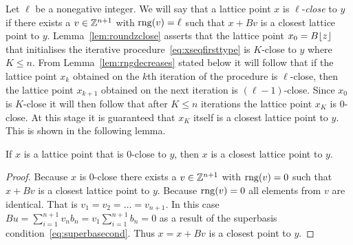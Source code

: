\documentclass[final,leqno]{siamltex}
\begin{document}
Let $\ell$ be a nonegative integer.  We will say that a lattice point $x$ is $\ell$-\emph{close} to $y$ if there exists a $v \in {\mathbb Z}^{n+1}$ with $\operatorname{rng}(v) = \ell$ such that $x + Bv$ is a closest lattice point to $y$.  Lemma~\ref{lem:roundzclose} asserts that the lattice point $x_0 = B{\left\lfloor z \right\rfloor}$ that initialises the iterative procedure~\eqref{eq:xseqfirsttype} is $K$-close to $y$ where $K \leq n$.  From Lemma~\ref{lem:rngdecreases} stated below it will follow that if the lattice point $x_k$ obtained on the $k$th iteration of the procedure is $\ell$-close, then the lattice point $x_{k+1}$ obtained on the next iteration is $(\ell-1)$-close.  Since $x_0$ is $K$-close it will then follow that after $K \leq n$ iterations the lattice point $x_K$ is $0$-close.  At this stage it is guaranteed that $x_{K}$ itself is a closest lattice point to $y$.  This is shown in the following lemma.  

\begin{lemma}\label{lem:rngzeroclosestpoint}
If $x$ is a lattice point that is $0$-close to $y$, then $x$ is a closest lattice point to $y$.
\end{lemma}
\begin{proof}
Because $x$ is $0$-close there exists a $v \in {\mathbb Z}^{n+1}$ with $\operatorname{rng}(v) = 0$ such that $x + Bv$ is a closest lattice point to $y$.  Because $\operatorname{rng}(v) = 0$ all elements from $v$ are identical.  That is $v_1=v_2=\dots=v_{n+1}$.  In this case $Bu = \sum_{i=1}^{n+1} v_n b_n = v_1\sum_{i=1}^{n+1}b_n = 0$
as a result of the superbasis condition~\eqref{eq:superbasecond}.  Thus $x = x + Bv$ is a closest point to $y$. 
\end{proof}
\end{document}
